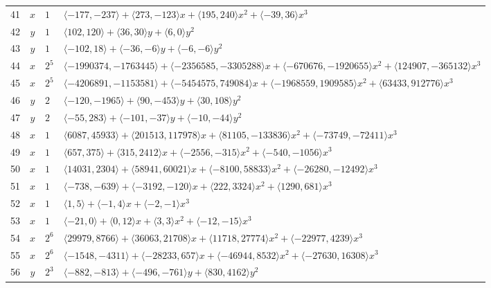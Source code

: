 \documentclass[11pt]{article}
\begin{document}
{\begin{longtable}{@{}rcl>{\raggedright\arraybackslash}p{}@{}}
41 & $x$ & $1$ & $\langle -177,-237\rangle+\langle 273,-123\rangle x+\langle 195,240\rangle x^{2}+\langle -39,36\rangle x^{3}$\\
42 & $y$ & $1$ & $\langle 102,120\rangle+\langle 36,30\rangle y+\langle 6,0\rangle y^{2}$\\
43 & $y$ & $1$ & $\langle -102,18\rangle+\langle -36,-6\rangle y+\langle -6,-6\rangle y^{2}$\\
44 & $x$ & $2^{5}$ & $\langle -1990374,-1763445\rangle+\langle -2356585,-3305288\rangle x+\langle -670676,-1920655\rangle x^{2}+\langle 124907,-365132\rangle x^{3}$\\
45 & $x$ & $2^{5}$ & $\langle -4206891,-1153581\rangle+\langle -5454575,749084\rangle x+\langle -1968559,1909585\rangle x^{2}+\langle 63433,912776\rangle x^{3}$\\
46 & $y$ & $2$ & $\langle -120,-1965\rangle+\langle 90,-453\rangle y+\langle 30,108\rangle y^{2}$\\
47 & $y$ & $2$ & $\langle -55,283\rangle+\langle -101,-37\rangle y+\langle -10,-44\rangle y^{2}$\\
48 & $x$ & $1$ & $\langle 6087,45933\rangle+\langle 201513,117978\rangle x+\langle 81105,-133836\rangle x^{2}+\langle -73749,-72411\rangle x^{3}$\\
49 & $x$ & $1$ & $\langle 657,375\rangle+\langle 315,2412\rangle x+\langle -2556,-315\rangle x^{2}+\langle -540,-1056\rangle x^{3}$\\
50 & $x$ & $1$ & $\langle 14031,2304\rangle+\langle 58941,60021\rangle x+\langle -8100,58833\rangle x^{2}+\langle -26280,-12492\rangle x^{3}$\\
51 & $x$ & $1$ & $\langle -738,-639\rangle+\langle -3192,-120\rangle x+\langle 222,3324\rangle x^{2}+\langle 1290,681\rangle x^{3}$\\
52 & $x$ & $1$ & $\langle 1,5\rangle+\langle -1,4\rangle x+\langle -2,-1\rangle x^{3}$\\
53 & $x$ & $1$ & $\langle -21,0\rangle+\langle 0,12\rangle x+\langle 3,3\rangle x^{2}+\langle -12,-15\rangle x^{3}$\\
54 & $x$ & $2^{6}$ & $\langle 29979,8766\rangle+\langle 36063,21708\rangle x+\langle 11718,27774\rangle x^{2}+\langle -22977,4239\rangle x^{3}$\\
55 & $x$ & $2^{6}$ & $\langle -1548,-4311\rangle+\langle -28233,657\rangle x+\langle -46944,8532\rangle x^{2}+\langle -27630,16308\rangle x^{3}$\\
56 & $y$ & $2^{3}$ & $\langle -882,-813\rangle+\langle -496,-761\rangle y+\langle 830,4162\rangle y^{2}$\\

\end{longtable}}
\end{document}
